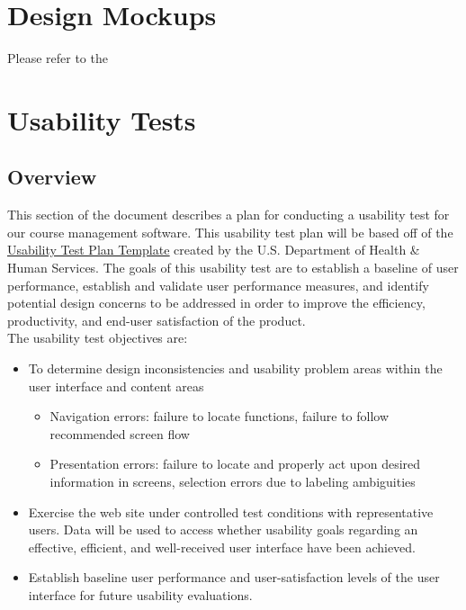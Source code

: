 \documentclass[10pt]{article}
\begin{document}
\begin{multicols}{2}
\section*{Design Mockups}
Please refer to the 

\section*{Usability Tests}
\subsection*{Overview}
This section of the document describes a plan for conducting a usability test for our course management software. This usability test plan will be based off of the \href{http://www.usability.gov/how-to-and-tools/resources/templates/usability-test-plan-template.html}{\underline{Usability Test Plan Template}} created by the U.S. Department of Health \& Human Services. The goals of this usability test are to establish a baseline of user performance, establish and validate user performance measures, and identify potential design concerns to be addressed in order to improve the efficiency, productivity, and end-user satisfaction of the product.\\

The usability test objectives are:
\begin{itemize}
\item To determine design inconsistencies and usability problem areas within the user interface and content areas
	\begin{itemize}
	\item Navigation errors: failure to locate functions, failure to follow recommended screen flow
	\item Presentation errors: failure to locate and properly act upon desired information in screens, selection errors due to labeling ambiguities
	\end{itemize}
	
\item Exercise the web site under controlled test conditions with representative users. Data will be used to access whether usability goals regarding an effective, efficient, and well-received user interface have been achieved.

\item Establish baseline user performance and user-satisfaction levels of the user interface for future usability evaluations.
\end{itemize}


\end{multicols}
\end{document}
